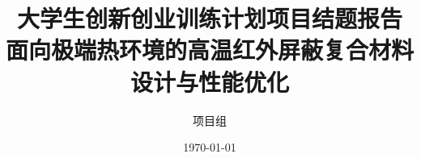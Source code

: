 \documentclass[oneside]{ctexbook}
\begin{document}
\frontmatter
\title{\Huge\bfseries 大学生创新创业训练计划项目结题报告\\[0.8em]\LARGE 面向极端热环境的高温红外屏蔽复合材料设计与性能优化}
\author{项目组}
\date{\today}
\maketitle

\tableofcontents

\mainmatter


\backmatter

\end{document}
